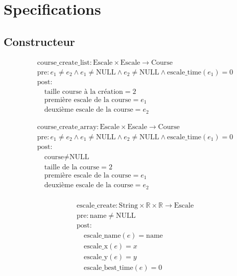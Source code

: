 \section{Specifications}\label{specifications}

\subsection{Constructeur}


\[
\begin{aligned}
&\text{course\_create\_list}: \text{Escale} \times \text{Escale} \to \text{Course} \\
&\text{pre}: e_1 \neq e_2 \land e_1 \neq \text{NULL} \land e_2 \neq \text{NULL} \land \text{escale\_time}(e_1) = 0 \\
&\text{post}: \\
&\quad \text{taille course à la création} = 2 \\
&\quad \text{première escale de la course} = e_1 \\
&\quad \text{deuxième  escale de la course} = e_2
\end{aligned}
\]



\[
\begin{aligned}
&\text{course\_create\_array}: \text{Escale} \times \text{Escale} \to \text{Course} \\
&\text{pre}: e_1 \neq e_2 \land e_1 \neq \text{NULL} \land e_2 \neq \text{NULL} \land \text{escale\_time}(e_1) = 0 \\
&\text{post}: \\
&\quad \text{course} \neq \text{NULL} \\
&\quad \text{taille de la course} = 2 \\
&\quad \text{première escale de la course} = e_1 \\
&\quad \text{deuxième escale de la course} = e_2 \\
\end{aligned}
\]


\[
\begin{aligned}
&\text{escale\_create}: \text{String} \times \mathbb{R} \times \mathbb{R} \to \text{Escale} \\
&\text{pre}: \text{name} \neq \text{NULL} \\
&\text{post}: \\
&\quad \text{escale\_name}(e) = \text{name} \\
&\quad \text{escale\_x}(e) = x \\
&\quad \text{escale\_y}(e) = y \\
&\quad \text{escale\_best\_time}(e) = 0
\end{aligned}
\]


